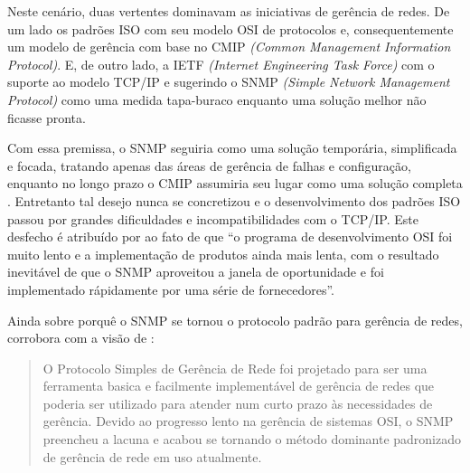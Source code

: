 \documentclass[twoside,english,brazilian]{UNISINOSmonografia}
\begin{document}
Neste cenário, duas vertentes dominavam as iniciativas de gerência de redes. 
De um lado os padrões ISO com seu modelo OSI de protocolos e, consequentemente 
um modelo de gerência com base no CMIP \textit{(Common Management Information 
Protocol)}.
E, de outro lado, a IETF \textit{(Internet Engineering Task Force)} com o 
suporte ao modelo TCP/IP e sugerindo o SNMP \textit{(Simple Network Management 
Protocol)} como uma medida tapa-buraco enquanto uma solução melhor não ficasse 
pronta.

Com essa premissa, o SNMP seguiria como uma solução temporária, simplificada e 
focada, tratando apenas das áreas de gerência de falhas e configuração, 
enquanto no longo prazo o CMIP assumiria seu lugar como uma solução completa 
\cite{Leinwand1996,stallings1999snmp}. 
Entretanto tal desejo nunca se concretizou e o desenvolvimento dos padrões ISO 
passou por grandes dificuldades e incompatibilidades com o TCP/IP.
Este desfecho é atribuído por  ao fato de que 
``o programa de 
desenvolvimento OSI foi muito lento e a implementação de produtos ainda mais 
lenta, com o resultado inevitável de que o SNMP aproveitou a janela de 
oportunidade e foi implementado rápidamente por uma série de fornecedores''.

Ainda sobre porquê o SNMP se tornou o protocolo padrão para gerência de redes, 
 corrobora com a visão de :

\begin{quote}
O Protocolo Simples de Gerência de Rede foi projetado para ser uma ferramenta 
basica e facilmente implementável de gerência de redes que poderia ser 
utilizado para atender num curto prazo às necessidades de gerência. Devido ao 
progresso lento na gerência de sistemas OSI, o SNMP preencheu a lacuna e 
acabou se tornando o método dominante padronizado de gerência de rede em uso 
atualmente.
\cite[p.~83]{stallings1999snmp}
\end{quote}
\end{document}
